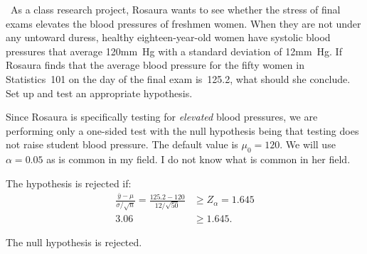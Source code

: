 \begin{problem}
  ~As a class research project, Rosaura wants to see whether the stress of final exams elevates the blood pressures of freshmen women.  When they are not under any untoward duress, healthy eighteen-year-old women have systolic blood pressures that average 120mm~Hg with a standard deviation of 12mm~Hg.  If Rosaura finds that the average blood pressure for the fifty women in Statistics~101 on the day of the final exam is~125.2, what should she conclude.  Set up and test an appropriate hypothesis.
\end{problem}

\noindent
Since Rosaura is specifically testing for \textit{elevated} blood pressures, we are performing only a one-sided test with the null hypothesis being that testing does not raise student blood pressure.  The default value is ${\mu_0 = 120}$.  We will use ~${\alpha=0.05}$ as is common in my field.  I do not know what is common in her field.

\noindent
The hypothesis is rejected if:
\begin{align*}
  \frac{\bar{y} - \mu}{\sigma / \sqrt{n}} = \frac{125.2 - 120}{12 / \sqrt{50}} &\geq Z_{\alpha} = 1.645 \\
  3.06 &\geq 1.645\text{.}
\end{align*}

\noindent
The null hypothesis is rejected.
